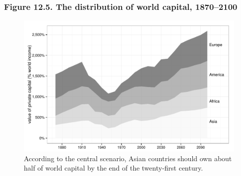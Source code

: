 \documentclass[t]{beamer}\usepackage[]{graphicx}\usepackage[]{color}
\newenvironment{knitrout}{}{} %
\begin{document}
\begin{frame}[label=Figure_12_5]
\frametitle{Figure 12.5. The distribution of world capital, 1870--2100}
\begin{figure}[t]
\begin{minipage}[b]{\textwidth}
\centering
\begin{knitrout}\footnotesize
{}\color{fgcolor}

{\centering \includegraphics[width=1\linewidth]{figures/bw/Figure_12_5} 

}



\end{knitrout}
\caption{According to the central scenario, Asian countries should own about half of world capital by the end of the twenty-first century.} %
\end{minipage}
\end{figure}
\end{frame}
\end{document}
